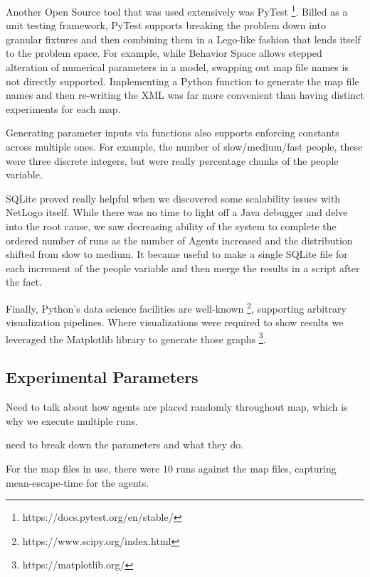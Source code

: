 \documentclass[12pt,letterpaper]{article}
\begin{document}
Another Open Source tool that was used extensively was PyTest \footnote{https://docs.pytest.org/en/stable/}. Billed as a
unit testing framework, PyTest supports breaking the problem down into granular
fixtures and then combining them in a Lego-like fashion that lends itself to the
problem space. For example, while Behavior Space allows stepped alteration of
numerical parameters in a model, swapping out map file names is not directly
supported. Implementing a Python function to generate the map file names and
then re-writing the XML was far more convenient than having distinct
experiments for each map.

Generating parameter inputs via functions also supports enforcing constants
across multiple ones. For example, the number of slow/medium/fast people, these
were three discrete integers, but were really percentage chunks of the people
variable.


SQLite proved really helpful when we discovered some scalability issues with
NetLogo itself. While there was no time to light off a Java debugger and delve
into the root cause, we saw decreasing ability of the system to complete the
ordered number of runs as the number of Agents increased and the distribution
shifted from slow to medium. It became useful to make a single SQLite file for
each increment of the people variable and then merge the results in a script
after the fact.

Finally, Python's data science facilities are well-known \footnote{https://www.scipy.org/index.html}, supporting arbitrary visualization pipelines.  Where visualizations were required to show results we leveraged the Matplotlib library to generate those graphs \footnote{ https://matplotlib.org/}.

\subsection{Experimental Parameters}
Need to talk about how agents are placed randomly throughout map, which is why we execute multiple runs.

need to break down the parameters and what they do.  

For the map files in use, there were 10 runs against the map files, capturing
mean-escape-time for the agents.
\end{document}
